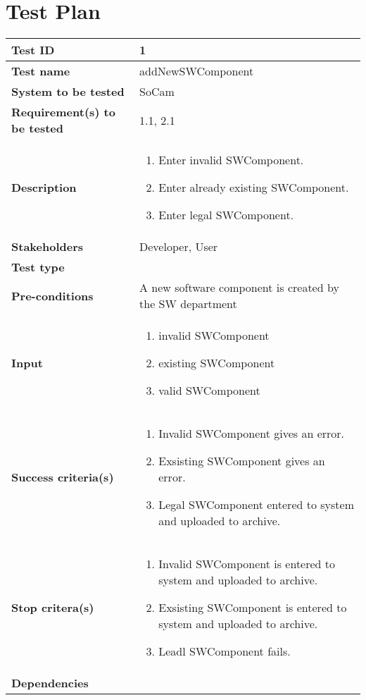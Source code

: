 \chapter{Test Plan}

\clearpage

		\begin{table}[H]
			\begin{tabular}{| p{4cm} | p{10cm} |}
			\hline
			\rowcolor{gray}
				{\bf Test ID} & 1 \\ \hline
				{\bf Test name} & addNewSWComponent \\ \hline
				{\bf System to be tested} & SoCam \\ \hline
				{\bf Requirement(s) to be tested} & 1.1, 2.1 \\ \hline
				{\bf Description} & 
					\begin{enumerate}
						\item Enter invalid SWComponent.
						\item Enter already existing SWComponent.
						\item Enter legal SWComponent.
					\end{enumerate}
				\\ \hline
				{\bf Stakeholders} & Developer, User \\ \hline
				{\bf Test type} & \\ \hline
				{\bf Pre-conditions} & A new software component is created by the 
				SW department\\ \hline
				{\bf Input} & 
					\begin{enumerate}
						\item invalid SWComponent
						\item existing SWComponent
						\item valid SWComponent
					\end{enumerate}
				\\ \hline
				{\bf Success criteria(s)} & 
					\begin{enumerate}
						\item Invalid SWComponent gives an error.
						\item Exsisting SWComponent gives an error.
						\item Legal SWComponent entered to system and uploaded to archive.
					\end{enumerate}
				\\ \hline
				{\bf Stop critera(s)} &  
					\begin{enumerate}
						\item Invalid SWComponent is entered to system and uploaded to archive.
						\item Exsisting SWComponent is entered to system and uploaded to archive.
						\item Leadl SWComponent fails.
					\end{enumerate} \\ \hline
				{\bf Dependencies} & \\ \hline
			\end{tabular}
		\end{table}

